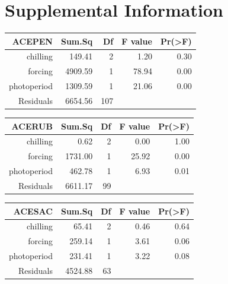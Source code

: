 \documentclass{article}\usepackage[]{graphicx}\usepackage[]{color}
\begin{document}
\begin{enumerate}
\begin{enumerate}
\end{enumerate}

\end {enumerate}









\section*{Supplemental Information}
\begin{table}[ht]
\centering
\begin{tabular}{rrrrr}
  \hline
  ACEPEN & Sum.Sq & Df & F value & Pr(>F) \\
 \hline
chilling & 149.41 &   2 & 1.20 & 0.30 \\ 
  forcing & 4909.59 &   1 & 78.94 & 0.00 \\ 
  photoperiod & 1309.59 &   1 & 21.06 & 0.00 \\ 
  Residuals & 6654.56 & 107 &  &  \\ 
   \hline
\end{tabular}
\end{table}
\begin{table}[ht]
\centering
\begin{tabular}{rrrrr}
  \hline
  ACERUB & Sum.Sq & Df & F value & Pr(>F) \\
 \hline
chilling & 0.62 &   2 & 0.00 & 1.00 \\ 
  forcing & 1731.00 &   1 & 25.92 & 0.00 \\ 
  photoperiod & 462.78 &   1 & 6.93 & 0.01 \\ 
  Residuals & 6611.17 &  99 &  &  \\ 
   \hline
\end{tabular}
\end{table}
\begin{table}[ht]
\centering
\begin{tabular}{rrrrr}
  \hline
  ACESAC & Sum.Sq & Df & F value & Pr(>F) \\
 \hline
chilling & 65.41 &   2 & 0.46 & 0.64 \\ 
  forcing & 259.14 &   1 & 3.61 & 0.06 \\ 
  photoperiod & 231.41 &   1 & 3.22 & 0.08 \\ 
  Residuals & 4524.88 &  63 &  &  \\ 
   \hline
\end{tabular}
\end{table}
\end{document}
